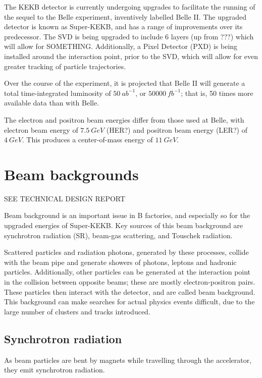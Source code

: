 \documentclass[12pt]{thesis}  %
\begin{document}
The KEKB detector is currently undergoing upgrades to facilitate the running of the sequel to the Belle experiment, inventively labelled Belle II. The upgraded detector is known as Super-KEKB, and has a range of improvements over its predecessor. The SVD is being upgraded to include 6 layers (up from ???) which will allow for SOMETHING. Additionally, a Pixel Detector (PXD) is being installed around the interaction point, prior to the SVD, which will allow for even greater tracking of particle trajectories.

Over the course of the experiment, it is projected that Belle II will generate a total time-integrated luminosity of $\SI{50}{ab^{-1}}$, or $\SI{50000}{fb^{-1}}$; that is, 50 times more available data than with Belle.

The electron and positron beam energies differ from those used at Belle, with electron beam energy of $\SI{7.5}{GeV}$ (HER?) and positron beam energy (LER?) of $\SI{4}{GeV}$. This produces a center-of-mass energy of $\SI{11}{GeV}$.


\pagebreak


\section{Beam backgrounds}

SEE TECHNICAL DESIGN REPORT

Beam background is an important issue in B factories, and especially so for the upgraded energies of Super-KEKB. Key sources of this beam background are synchrotron radiation (SR), beam-gas scattering, and Touschek radiation.

Scattered particles and radiation photons, generated by these processes, collide with the beam pipe and generate showers of photons, leptons and hadronic particles. Additionally, other particles can be generated at the interaction point in the collision between opposite beams; these are mostly electron-positron pairs. These particles then interact with the detector, and are called beam background. This background can make searches for actual physics events difficult, due to the large number of clusters and tracks introduced.

\subsection{Synchrotron radiation}

As beam particles are bent by magnets while travelling through the accelerator, they emit synchrotron radiation.
\end{document}
